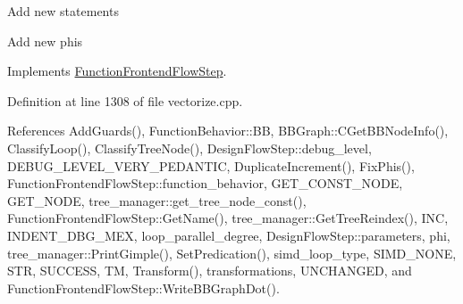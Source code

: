 Add new statements

Add new phis 

Implements \hyperlink{classFunctionFrontendFlowStep_a00612f7fb9eabbbc8ee7e39d34e5ac68}{Function\+Frontend\+Flow\+Step}.



Definition at line 1308 of file vectorize.\+cpp.



References Add\+Guards(), Function\+Behavior\+::\+BB, B\+B\+Graph\+::\+C\+Get\+B\+B\+Node\+Info(), Classify\+Loop(), Classify\+Tree\+Node(), Design\+Flow\+Step\+::debug\+\_\+level, D\+E\+B\+U\+G\+\_\+\+L\+E\+V\+E\+L\+\_\+\+V\+E\+R\+Y\+\_\+\+P\+E\+D\+A\+N\+T\+IC, Duplicate\+Increment(), Fix\+Phis(), Function\+Frontend\+Flow\+Step\+::function\+\_\+behavior, G\+E\+T\+\_\+\+C\+O\+N\+S\+T\+\_\+\+N\+O\+DE, G\+E\+T\+\_\+\+N\+O\+DE, tree\+\_\+manager\+::get\+\_\+tree\+\_\+node\+\_\+const(), Function\+Frontend\+Flow\+Step\+::\+Get\+Name(), tree\+\_\+manager\+::\+Get\+Tree\+Reindex(), I\+NC, I\+N\+D\+E\+N\+T\+\_\+\+D\+B\+G\+\_\+\+M\+EX, loop\+\_\+parallel\+\_\+degree, Design\+Flow\+Step\+::parameters, phi, tree\+\_\+manager\+::\+Print\+Gimple(), Set\+Predication(), simd\+\_\+loop\+\_\+type, S\+I\+M\+D\+\_\+\+N\+O\+NE, S\+TR, S\+U\+C\+C\+E\+SS, TM, Transform(), transformations, U\+N\+C\+H\+A\+N\+G\+ED, and Function\+Frontend\+Flow\+Step\+::\+Write\+B\+B\+Graph\+Dot().

